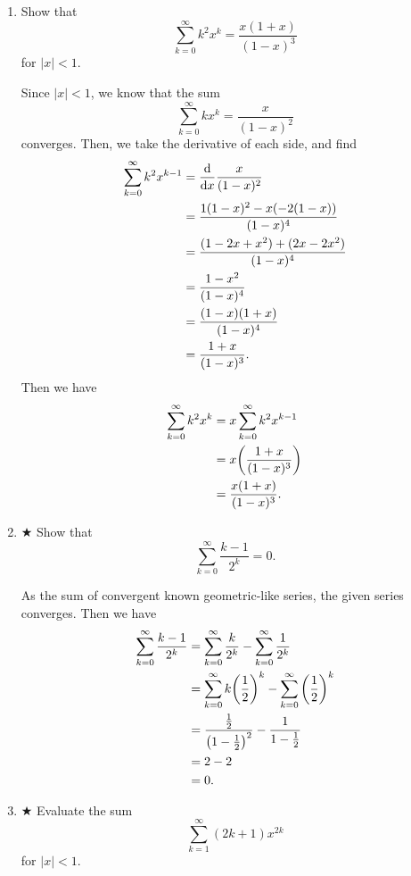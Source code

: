 \documentclass[AppendixA]{subfiles}
\begin{document}
\begin{enumerate}[leftmargin=\labelsep]
		\item Show that
		\[
			\sum_{k = 0}^\infty k^2 x^k = \frac{x(1 + x)}{(1 - x)^3}
		\]
		for $|x| < 1$.
		\begin{answer}
			Since $|x| < 1$, we know that the sum
			\[
				\sum_{k = 0}^\infty kx^k = \frac{x}{(1-x)^2}
			\]
			converges. Then, we take the derivative of each side, and find
			\begin{align*}
				\sum_{k = 0}^\infty k^2x^{k - 1} &= \dv{}{x} \frac{x}{(1-x)^2}\\
					&= \frac{1(1-x)^2 - x(-2(1 - x))}{(1-x)^4}\\
					&= \frac{(1 - 2x + x^2 )+ (2x - 2x^2)}{(1-x)^4}\\
					&= \frac{1 - x^2}{(1-x)^4}\\
					&= \frac{(1 - x)(1 + x)}{(1-x)^4}\\
					&= \frac{1 + x}{(1-x)^3}.
			\end{align*}
			Then we have
			\begin{align*}
				\sum_{k = 0}^\infty k^2 x^k &= x \sum_{k = 0}^\infty k^2x^{k - 1}\\
					&= x \qty(\frac{1 + x}{(1-x)^3})\\
					&= \frac{x(1 + x)}{(1-x)^3}.
			\end{align*}
		\end{answer}
		
		\item $\bigstar$ Show that
		\[
			\sum_{k = 0}^\infty \frac{k - 1}{2^k} = 0.
		\]
		\begin{answer}
			As the sum of convergent known geometric-like series, the given series converges. Then we have
			\begin{align*}
				\sum_{k = 0}^\infty \frac{k - 1}{2^k} &= \sum_{k = 0}^\infty \frac{k}{2^k} - \sum_{k = 0}^\infty \frac{1}{2^k}\\
					&= \sum_{k = 0}^\infty k\qty(\frac{1}{2})^k - \sum_{k = 0}^\infty \qty(\frac{1}{2})^k\\
					&= \frac{\frac{1}{2}}{\qty(1 - \frac{1}{2})^2} - \frac{1}{1 - \frac{1}{2}}\\
					&= 2 - 2\\
					&= 0.
			\end{align*}
		\end{answer}
		
		\item $\bigstar$ Evaluate the sum
		\[
			\sum_{k = 1}^\infty (2k + 1)x^{2k}
		\]
		for $|x| < 1$.
		\begin{answer}
			

\end{answer}
\end{enumerate}
\end{document}
